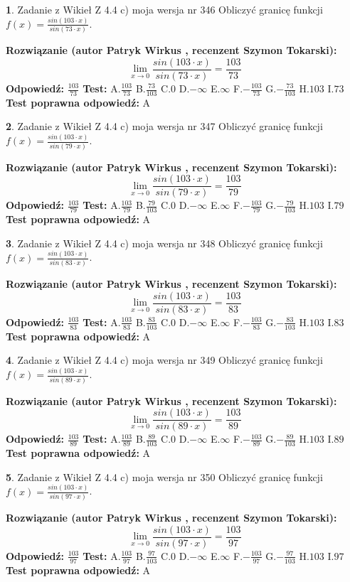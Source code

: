 \documentclass[12pt, a4paper]{article}
\theoremstyle{definition} %
\newtheorem{zad}{}
\newcommand{\zadStart}[1]{\begin{zad}#1\newline}
\newcommand{\zadStop}{\end{zad}}
\newcommand{\rozwStart}[2]{\noindent \textbf{Rozwiązanie (autor #1 , recenzent #2): }\newline}
\newcommand{\rozwStop}{\newline}
\newcommand{\odpStart}{\noindent \textbf{Odpowiedź:}\newline}
\newcommand{\odpStop}{\newline}
\newcommand{\testStart}{\noindent \textbf{Test:}\newline}
\newcommand{\testStop}{\newline}
\newcommand{\kluczStart}{\noindent \textbf{Test poprawna odpowiedź:}\newline}
\newcommand{\kluczStop}{\newline}
\begin{document}
\zadStart{Zadanie z Wikieł Z 4.4 c) moja wersja nr 346}
Obliczyć granicę funkcji $f(x)=\frac{sin(103\cdot x)}{sin(73\cdot x)}$.
\zadStop
\rozwStart{Patryk Wirkus}{Szymon Tokarski}
$$\lim\limits_{x\to 0}\frac{sin(103\cdot x)}{sin(73\cdot x)}=
\frac{103}{73}$$
\rozwStop
\odpStart
$\frac{103}{73}$
\odpStop
\testStart
A.$\frac{103}{73}$
B.$\frac{73}{103}$
C.$0$
D.$-\infty$
E.$\infty$
F.$-\frac{103}{73}$
G.$-\frac{73}{103}$
H.$103$
I.$73$
\testStop
\kluczStart
A
\kluczStop



\zadStart{Zadanie z Wikieł Z 4.4 c) moja wersja nr 347}
Obliczyć granicę funkcji $f(x)=\frac{sin(103\cdot x)}{sin(79\cdot x)}$.
\zadStop
\rozwStart{Patryk Wirkus}{Szymon Tokarski}
$$\lim\limits_{x\to 0}\frac{sin(103\cdot x)}{sin(79\cdot x)}=
\frac{103}{79}$$
\rozwStop
\odpStart
$\frac{103}{79}$
\odpStop
\testStart
A.$\frac{103}{79}$
B.$\frac{79}{103}$
C.$0$
D.$-\infty$
E.$\infty$
F.$-\frac{103}{79}$
G.$-\frac{79}{103}$
H.$103$
I.$79$
\testStop
\kluczStart
A
\kluczStop



\zadStart{Zadanie z Wikieł Z 4.4 c) moja wersja nr 348}
Obliczyć granicę funkcji $f(x)=\frac{sin(103\cdot x)}{sin(83\cdot x)}$.
\zadStop
\rozwStart{Patryk Wirkus}{Szymon Tokarski}
$$\lim\limits_{x\to 0}\frac{sin(103\cdot x)}{sin(83\cdot x)}=
\frac{103}{83}$$
\rozwStop
\odpStart
$\frac{103}{83}$
\odpStop
\testStart
A.$\frac{103}{83}$
B.$\frac{83}{103}$
C.$0$
D.$-\infty$
E.$\infty$
F.$-\frac{103}{83}$
G.$-\frac{83}{103}$
H.$103$
I.$83$
\testStop
\kluczStart
A
\kluczStop



\zadStart{Zadanie z Wikieł Z 4.4 c) moja wersja nr 349}
Obliczyć granicę funkcji $f(x)=\frac{sin(103\cdot x)}{sin(89\cdot x)}$.
\zadStop
\rozwStart{Patryk Wirkus}{Szymon Tokarski}
$$\lim\limits_{x\to 0}\frac{sin(103\cdot x)}{sin(89\cdot x)}=
\frac{103}{89}$$
\rozwStop
\odpStart
$\frac{103}{89}$
\odpStop
\testStart
A.$\frac{103}{89}$
B.$\frac{89}{103}$
C.$0$
D.$-\infty$
E.$\infty$
F.$-\frac{103}{89}$
G.$-\frac{89}{103}$
H.$103$
I.$89$
\testStop
\kluczStart
A
\kluczStop



\zadStart{Zadanie z Wikieł Z 4.4 c) moja wersja nr 350}
Obliczyć granicę funkcji $f(x)=\frac{sin(103\cdot x)}{sin(97\cdot x)}$.
\zadStop
\rozwStart{Patryk Wirkus}{Szymon Tokarski}
$$\lim\limits_{x\to 0}\frac{sin(103\cdot x)}{sin(97\cdot x)}=
\frac{103}{97}$$
\rozwStop
\odpStart
$\frac{103}{97}$
\odpStop
\testStart
A.$\frac{103}{97}$
B.$\frac{97}{103}$
C.$0$
D.$-\infty$
E.$\infty$
F.$-\frac{103}{97}$
G.$-\frac{97}{103}$
H.$103$
I.$97$
\testStop
\kluczStart
A
\kluczStop
\end{document}
